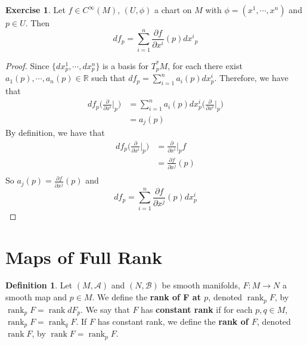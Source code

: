 \documentclass{book}
\theoremstyle{definition}
\newtheorem{defn}[definition]{Definition}
\newtheorem{ex}[definition]{Exercise}
\newcommand{\R}{\mathbb{R}}
\newcommand{\MA}{\mathcal{A}}
\newcommand{\MB}{\mathcal{B}}
\DeclareMathOperator{\rnk}{rank}
\DeclareMathOperator*{\0}{\mbf{0}}
\DeclareMathOperator*{\1}{\mbf{1}}
\newcommand{\p}{\partial}
\begin{document}
	\begin{ex}
		Let $f \in C^{\infty}(M)$, $(U, \phi)$ a chart on $M$ with $\phi = (x^1, \cdots, x^n)$ and $p \in U$. Then $$df_p = \sum_{i=1}^n \frac{\p f}{\p x^i}(p) {dx^i}_p$$
	\end{ex}

	\begin{proof}
		 Since $\{dx^1_p, \cdots, dx^n_p\}$ is a basis for $T^*_pM$, for each there exist $a_1(p), \cdots, a_n(p) \in \R$ such that $df_p = \sum\limits_{i=1}^n a_i(p)dx^i_p$. Therefore, we have that 
		\begin{align*}
			df_p \bigg(\frac{\p}{\p x^i} \bigg|_p \bigg) 
			&= \sum\limits_{i=1}^n a_i(p)dx^i_p \bigg(\frac{\p}{\p x^i} \bigg|_p \bigg)  \\
			&=  a_j(p)
		\end{align*}
		By definition, we have that 
		\begin{align*}
			df_p\bigg(\frac{\p}{\p x^i} \bigg|_p \bigg) 
			&= \frac{\p}{\p x^i} \bigg|_p f \\ 
			&= \frac{\p f}{\p x^j}(p)\\
		\end{align*}
		So $a_j(p) = \frac{\p f}{\p x^j} (p)$ and $$df_p = \sum\limits_{i=1}^n \frac{\p f}{\p x^j} (p)dx^i_p$$
	\end{proof}
		
	
	
	
	
	
	
	
	
	
	
	
	
	
	
	
	
	
	
	\newpage
	\section{Maps of Full Rank}
	
	\begin{defn}
		Let $(M, \MA)$ and $(N, \MB)$ be smooth manifolds, $F: M \rightarrow N$ a smooth map and $p \in M$. We define the \textbf{rank of F at $p$}, denoted $\rnk_p F$, by $\rnk_p F = \rnk dF_p$. We say that $F$ has \textbf{constant rank} if for each $p, q \in M$, $\rnk_p F = \rnk_q F$. If $F$ has constant rank, we define the \textbf{rank of $F$}, denoted $\rnk F$, by $\rnk F = \rnk_p F$.
		
	\end{defn}
	
\end{document}

